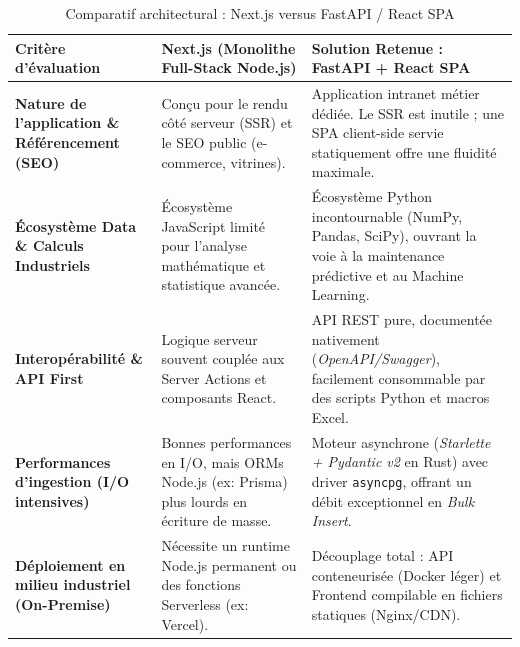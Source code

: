 \begin{table}[H]
\centering
\small
\renewcommand{\arraystretch}{1.3}
\begin{tabular}{|p{3.8cm}|p{5.5cm}|p{5.5cm}|}
\hline
\textbf{Critère d'évaluation} & \textbf{Next.js (Monolithe Full-Stack Node.js)} & \textbf{Solution Retenue : FastAPI + React SPA} \\
\hline
\hline
\textbf{Nature de l'application \& Référencement (SEO)} & Conçu pour le rendu côté serveur (SSR) et le SEO public (e-commerce, vitrines). & Application intranet métier dédiée. Le SSR est inutile ; une SPA client-side servie statiquement offre une fluidité maximale. \\
\hline
\textbf{Écosystème Data \& Calculs Industriels} & Écosystème JavaScript limité pour l'analyse mathématique et statistique avancée. & Écosystème Python incontournable (NumPy, Pandas, SciPy), ouvrant la voie à la maintenance prédictive et au Machine Learning. \\
\hline
\textbf{Interopérabilité \& API First} & Logique serveur souvent couplée aux Server Actions et composants React. & API REST pure, documentée nativement (\textit{OpenAPI/Swagger}), facilement consommable par des scripts Python et macros Excel. \\
\hline
\textbf{Performances d'ingestion (I/O intensives)} & Bonnes performances en I/O, mais ORMs Node.js (ex: Prisma) plus lourds en écriture de masse. & Moteur asynchrone (\textit{Starlette + Pydantic v2} en Rust) avec driver \texttt{asyncpg}, offrant un débit exceptionnel en \textit{Bulk Insert}. \\
\hline
\textbf{Déploiement en milieu industriel (On-Premise)} & Nécessite un runtime Node.js permanent ou des fonctions Serverless (ex: Vercel). & Découplage total : API conteneurisée (Docker léger) et Frontend compilable en fichiers statiques (Nginx/CDN). \\
\hline
\end{tabular}
\caption{Comparatif architectural : Next.js versus FastAPI / React SPA}
\label{tab:benchmark_archi}
\end{table}

